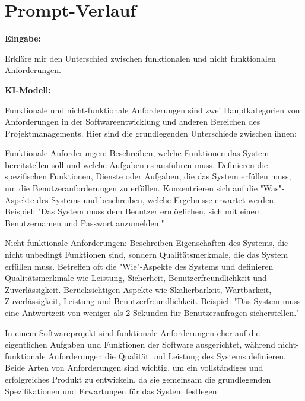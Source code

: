 \section{Prompt-Verlauf}

\textbf{Eingabe:} 

Erkläre mir den Unterschied zwischen funktionalen und nicht funktionalen Anforderungen.

\textbf{KI-Modell:} 

Funktionale und nicht-funktionale Anforderungen sind zwei Hauptkategorien von Anforderungen in der Softwareentwicklung und anderen Bereichen des Projektmanagements. Hier sind die grundlegenden Unterschiede zwischen ihnen:

Funktionale Anforderungen:
Beschreiben, welche Funktionen das System bereitstellen soll und welche Aufgaben es ausführen muss.
Definieren die spezifischen Funktionen, Dienste oder Aufgaben, die das System erfüllen muss, um die Benutzeranforderungen zu erfüllen.
Konzentrieren sich auf die "Was"-Aspekte des Systems und beschreiben, welche Ergebnisse erwartet werden.
Beispiel: "Das System muss dem Benutzer ermöglichen, sich mit einem Benutzernamen und Passwort anzumelden."

Nicht-funktionale Anforderungen:
Beschreiben Eigenschaften des Systems, die nicht unbedingt Funktionen sind, sondern Qualitätsmerkmale, die das System erfüllen muss.
Betreffen oft die "Wie"-Aspekte des Systems und definieren Qualitätsmerkmale wie Leistung, Sicherheit, Benutzerfreundlichkeit und Zuverlässigkeit.
Berücksichtigen Aspekte wie Skalierbarkeit, Wartbarkeit, Zuverlässigkeit, Leistung und Benutzerfreundlichkeit.
Beispiel: "Das System muss eine Antwortzeit von weniger als 2 Sekunden für Benutzeranfragen sicherstellen."

In einem Softwareprojekt sind funktionale Anforderungen eher auf die eigentlichen Aufgaben und Funktionen der Software ausgerichtet, während nicht-funktionale Anforderungen die Qualität und Leistung des Systems definieren. Beide Arten von Anforderungen sind wichtig, um ein vollständiges und erfolgreiches Produkt zu entwickeln, da sie gemeinsam die grundlegenden Spezifikationen und Erwartungen für das System festlegen.


